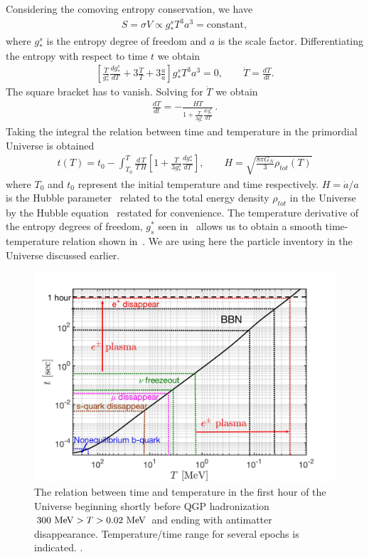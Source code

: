 Considering the comoving entropy conservation, we have
\begin{align}
S=\sigma V\propto g^s_\ast T^3a^3=\mathrm{constant},
\end{align}
where $g^s_\ast$ is the entropy degree of freedom and $a$ is the scale factor. Differentiating the entropy with respect to time $t$ we obtain
\begin{align}
\left[\frac{\dot{T}}{g^s_\ast}\frac{dg^s_\ast}{dT}+3\frac{\dot{T}}{T}+3\frac{\dot{a}}{a}\right]g^s_\ast T^3a^3=0,\qquad \dot{T}=\frac{dT}{dt}.
\end{align}
The square bracket has to vanish. Solving for $\dot T $ we obtain
\begin{align}
\frac{dT}{dt}=-\frac{HT}{1+\frac{T}{3g^s_\ast}\frac{d\,g^s_\ast}{dT}}\,.
\end{align}
Taking the integral the relation between time and temperature in the primordial Universe is obtained
\begin{align}\label{time}
t(T)=t_0-\int^T_{T_0} \frac{d\,T }{T\,H}\left[1+\frac{T}{3g^s_\ast}\frac{dg^s_\ast}{dT}\right],\qquad H=\sqrt{\frac{8\pi G_N}{3}\rho_{tot}(T)}
\end{align}
where $T_0$ and $t_0$ represent the initial temperature and time respectively. $H=\dot a/a$ is the Hubble parameter~ related to the total energy density $\rho_{tot}$ in the Universe by the Hubble equation~ restated for convenience. The temperature derivative of the entropy degrees of freedom, $g^\ast_s$ seen in~ allows us to obtain a smooth time-temperature relation shown in~. We are using here the particle inventory in the Universe discussed earlier.

\begin{figure}
\centerline{\includegraphics[width=0.90\linewidth]{01-introduction/Figures/CosmicTimeTemperature.jpg}}
 \caption{The relation between time and temperature in the first hour of the Universe beginning shortly before QGP hadronization $300\text{ MeV} >T>0.02\text{ MeV}  $ and ending with antimatter disappearance. Temperature/time range for several epochs is indicated. .}
 \label{Fig:Overview}
\end{figure}

